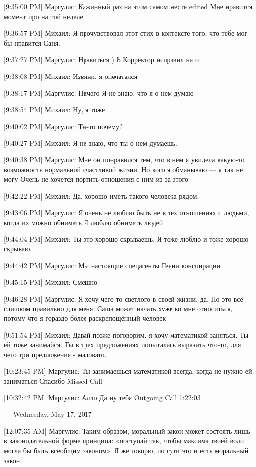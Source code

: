 \documentclass{article}
\begin{document}
[9:35:00 PM] Маргулис:
Кажинный раз на этом самом месте
edited 
Мне нравится момент про на той неделе

[9:36:57 PM] Михаил:
Я прочувствовал этот стих в контексте того, что тебе мог бы нравится Саня.

[9:37:27 PM] Маргулис:
Нравиться
 )
 Ь
 Корректор исправил на о

[9:38:08 PM] Михаил:
Извини, я опечатался

[9:38:17 PM] Маргулис:
Ничего
 Я не знаю, что я о нем думаю

[9:38:54 PM] Михаил:
Ну, я тоже

[9:40:02 PM] Маргулис:
Ты-то почему?

[9:40:27 PM] Михаил:
Я не знаю, что ты о нем думаешь.

[9:40:38 PM] Маргулис:
Мне он понравился тем, что в нем я увидела какую-то возможность нормальной счастливой жизни.
 Но кого я обманываю — я так не могу
 Очень не хочется портить отношения с ним из-за этого

[9:42:22 PM] Михаил:
Да, хорошо иметь такого человека рядом.

[9:43:06 PM] Маргулис:
Я очень не люблю быть не в тех отношениях с людьми, когда их можно обнимать
 Я люблю обнимать людей

[9:44:04 PM] Михаил:
Ты это хорошо скрываешь.
 Я тоже люблю и тоже хорошо скрываю.

[9:44:42 PM] Маргулис:
Мы настоящие спецагенты
 Гении конспирации

[9:45:15 PM] Михаил:
Смешно

[9:46:28 PM] Маргулис:
Я хочу чего-то светлого в своей жизни, да. Но это всё слишком правильно для меня. Саша может начать хуже ко мне относиться, потому что я гораздо более раскрепощённый человек

[9:51:54 PM] Михаил:
Давай позже поговорим, я хочу математикой заняться. Ты ей тоже занимайся. 
Ты в трех предложениях попыталась выразить что-то, для чего три предложения - маловато.

[10:23:45 PM] Маргулис:
Ты занимаешься математикой всегда, когда не нужно ей заниматься
 Спасибо
Missed Call

[10:32:42 PM] Маргулис:
Алло
 Да ну тебя
Outgoing Call 1:22:03

--- Wednesday, May 17, 2017 ---

[12:07:35 AM] Маргулис:
Таким образом, моральный закон может состоять лишь в законодательной форме принципа:
«поступай так, чтобы максима твоей воли могла бы быть всеобщим законом».
 Я же говорю, по сути это и есть моральный закон
\end{document}
